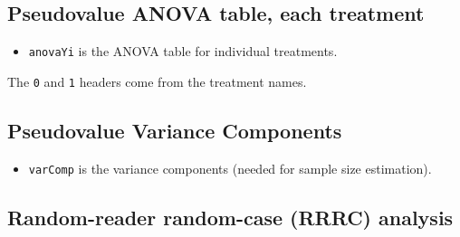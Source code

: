 \documentclass[]{book}
\newenvironment{Shaded}{\begin{snugshade}}{\end{snugshade}}
\newcommand{\CommentTok}[1]{\textcolor[rgb]{0.56,0.35,0.01}{\textit{#1}}}
\newcommand{\NormalTok}[1]{#1}
\newcommand{\OperatorTok}[1]{\textcolor[rgb]{0.81,0.36,0.00}{\textbf{#1}}}
\providecommand{\tightlist}{%
  \setlength{\itemsep}{0pt}\setlength{\parskip}{0pt}}
\begin{document}
\hypertarget{pseudovalue-anova-table-each-treatment}{%
\subsection{Pseudovalue ANOVA table, each treatment}\label{pseudovalue-anova-table-each-treatment}}

\begin{itemize}
\tightlist
\item
  \texttt{anovaYi} is the ANOVA table for individual treatments.
\end{itemize}

\begin{Shaded}
\end{Shaded}

The \texttt{0} and \texttt{1} headers come from the treatment names.

\hypertarget{pseudovalue-variance-components}{%
\subsection{Pseudovalue Variance Components}\label{pseudovalue-variance-components}}

\begin{itemize}
\tightlist
\item
  \texttt{varComp} is the variance components (needed for sample size estimation).
\end{itemize}

\begin{Shaded}
\end{Shaded}

\hypertarget{random-reader-random-case-rrrc-analysis}{%
\subsection{Random-reader random-case (RRRC) analysis}\label{random-reader-random-case-rrrc-analysis}}
\end{document}
